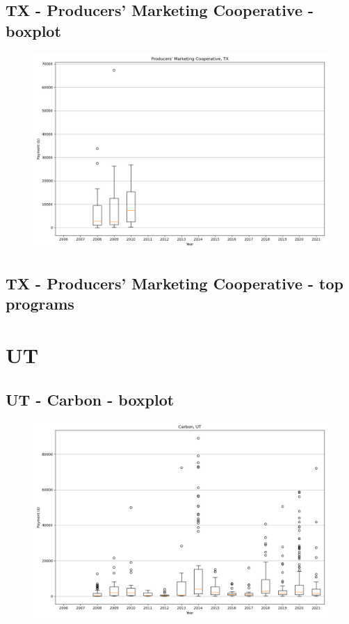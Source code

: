 \subsection*{TX - Producers' Marketing Cooperative - boxplot}
\begin{figure}[h]
\centering
\includegraphics[width=7in]{../output/boxplots/counties/Producers' Marketing Cooperative-TX_boxplot.png}
\end{figure}


\subsection*{TX - Producers' Marketing Cooperative - top programs}

\newpage
\section*{UT}
\subsection*{UT - Carbon - boxplot}
\begin{figure}[h]
\centering
\includegraphics[width=7in]{../output/boxplots/counties/Carbon-UT_boxplot.png}
\end{figure}


